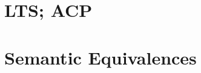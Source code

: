 \documentclass{article}
\begin{document}
\section{LTS; ACP}
\begin{multicols*}{2}

\end{multicols*}

\section{Semantic Equivalences}
\begin{multicols*}{2}

\end{multicols*}
\end{document}
